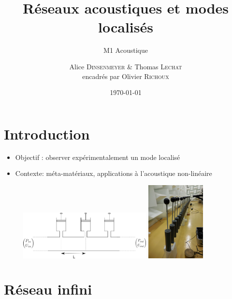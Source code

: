 \documentclass[12pt,xcolor=x11names,compress, notes=show]{beamer}%
\author{Alice \textsc{Dinsenmeyer} \& Thomas \textsc{Lechat} \\ encadrés par Olivier \textsc{Richoux}}
\title{ Réseaux acoustiques et modes localisés}
\subtitle{M1 Acoustique}
\date{\today}
\begin{document}
\begin{frame}
	\titlepage 
\end{frame}

\begin{frame}
\tableofcontents[hideallsubsections]
\end{frame}

\section*{Introduction}
\begin{frame}{\insertsectionhead}

\begin{itemize}
\item Objectif : observer expérimentalement un mode localisé
\item Contexte: méta-matériaux, applications à l'acoustique non-linéaire
\end{itemize}
	\centering
	\begin{figure}
		\centering
		\includegraphics[height=2.5cm]{schema_reseau_infini.png}\vspace{1.3cm}\hspace{0.5cm}
		\centering
		\includegraphics[height=4cm]{photo.jpg}
	\end{figure}
	
\end{frame}


\section{Réseau infini}
\end{document}
